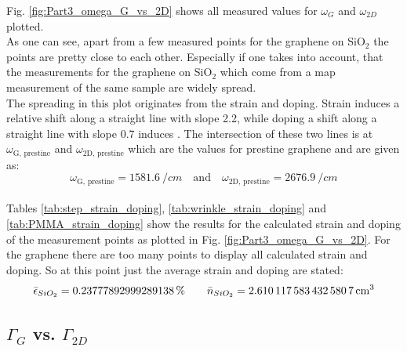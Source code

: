 \documentclass[%
 reprint,
amsmath,amssymb,
pra,
]{revtex4-1}
\begin{document}
Fig. \ref{fig:Part3_omega_G_vs_2D} shows all measured values for $\omega _G$ and $\omega _{2D}$ plotted. \\
As one can see, apart from a few measured points for the graphene on SiO$_2$ the points are pretty close to each other. Especially if one takes into account, that the measurements for the graphene on SiO$_2$ which come from a map measurement of the same sample are widely spread. \\
The spreading in this plot originates from the strain and doping. Strain induces a relative shift along a straight line with slope 2.2, while doping a shift along a straight line with slope 0.7 induces \citep{NeumannStampfer}. The intersection of these two lines is at $\omega _{\text{G, prestine}}$ and $\omega _{\text{2D, prestine}}$ which are the values for prestine graphene and are given as: 
\begin{equation*}
\omega _{\text{G, prestine}} = \SI{1581.6}{\per cm} \quad \text{and} \quad \omega _{\text{2D, prestine}} = \SI{2676.9}{\per cm}
\end{equation*} \\

Tables \ref{tab:step_strain_doping}, \ref{tab:wrinkle_strain_doping} and \ref{tab:PMMA_strain_doping} show the results for the calculated strain and doping of the measurement points as plotted in Fig. \ref{fig:Part3_omega_G_vs_2D}.  For the graphene there are too many points to display all calculated strain and doping. So at this point just the average strain and doping are stated:
\begin{equation*}
\bar{\epsilon} _{SiO_2} = 0.23777892999289138 \, \% \qquad \bar{n} _{SiO_2} = \SI{2.6101175834325807}{\per c \cubic m}
\end{equation*}


\subsection{$\Gamma _G$ vs. $\Gamma _{2D}$}
\end{document}
